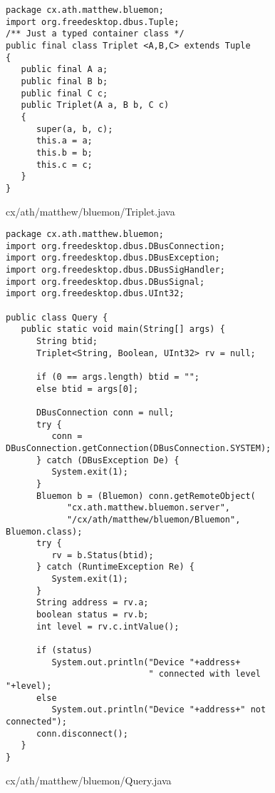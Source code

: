\documentclass[a4paper,12pt]{article}
\begin{document}
\newpage

\begin{figure}[!h]
\begin{center}
\begin{verbatim}
package cx.ath.matthew.bluemon;
import org.freedesktop.dbus.Tuple;
/** Just a typed container class */
public final class Triplet <A,B,C> extends Tuple
{
   public final A a;
   public final B b;
   public final C c;
   public Triplet(A a, B b, C c)
   {
      super(a, b, c);
      this.a = a;
      this.b = b;
      this.c = c;
   }
}
\end{verbatim}
\end{center}
\caption{cx/ath/matthew/bluemon/Triplet.java}
\end{figure}

\newpage

\begin{figure}[!h]
\begin{center}
\begin{verbatim}
package cx.ath.matthew.bluemon;
import org.freedesktop.dbus.DBusConnection;
import org.freedesktop.dbus.DBusException;
import org.freedesktop.dbus.DBusSigHandler;
import org.freedesktop.dbus.DBusSignal;
import org.freedesktop.dbus.UInt32;

public class Query {
   public static void main(String[] args) {
      String btid;
      Triplet<String, Boolean, UInt32> rv = null;
      
      if (0 == args.length) btid = "";
      else btid = args[0];
      
      DBusConnection conn = null;
      try {
         conn = DBusConnection.getConnection(DBusConnection.SYSTEM);
      } catch (DBusException De) {
         System.exit(1);
      }     
      Bluemon b = (Bluemon) conn.getRemoteObject(
            "cx.ath.matthew.bluemon.server", 
            "/cx/ath/matthew/bluemon/Bluemon", Bluemon.class);
      try {
         rv = b.Status(btid);
      } catch (RuntimeException Re) {
         System.exit(1);
      }
      String address = rv.a;
      boolean status = rv.b;
      int level = rv.c.intValue();

      if (status)
         System.out.println("Device "+address+
                            " connected with level "+level);
      else
         System.out.println("Device "+address+" not connected");
      conn.disconnect();
   }
}
\end{verbatim}
\end{center}
\caption{cx/ath/matthew/bluemon/Query.java}
\end{figure}
\end{document}
